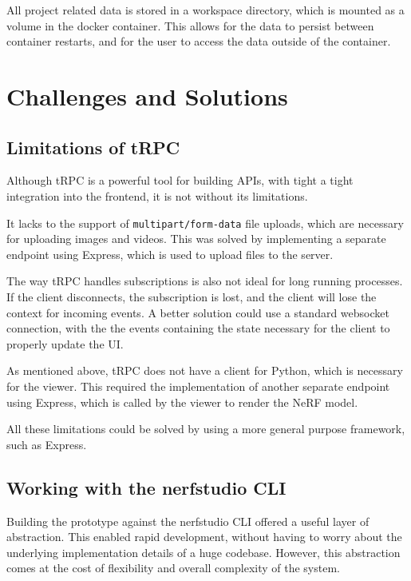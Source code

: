 All project related data is stored in a workspace directory, which is mounted as a volume in the docker container. 
This allows for the data to persist between container restarts, and for the user to access the data outside of the container.

\section{Challenges and Solutions}
\label{sec:system:challenges}

\subsection*{Limitations of tRPC}

Although tRPC is a powerful tool for building APIs, with tight a tight integration into the frontend, it is not without its limitations.

It lacks to the support of \texttt{multipart/form-data} file uploads, which are necessary for uploading images and videos.
This was solved by implementing a separate endpoint using Express, which is used to upload files to the server.

The way tRPC handles subscriptions is also not ideal for long running processes.
If the client disconnects, the subscription is lost, and the client will lose the context for incoming events.
A better solution could use a standard websocket connection, with the the events containing the state necessary for the client to properly update the UI.

As mentioned above, tRPC does not have a client for Python, which is necessary for the viewer. 
This required the implementation of another separate endpoint using Express, which is called by the viewer to render the NeRF model.

All these limitations could be solved by using a more general purpose framework, such as Express.

\subsection*{Working with the nerfstudio CLI}

Building the prototype against the nerfstudio CLI offered a useful layer of abstraction.
This enabled rapid development, without having to worry about the underlying implementation details of a huge codebase.
However, this abstraction comes at the cost of flexibility and overall complexity of the system.

